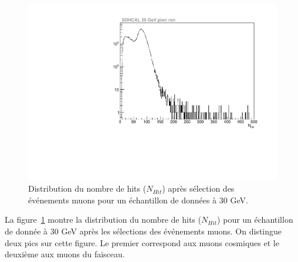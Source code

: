 \begin{figure}[!ht]
  \begin{center}
    \includegraphics[width=.7\textwidth]{SDHCAL/figs/nhitMuon.pdf}
    \caption{Distribution du nombre de hits ($N_{Hit}$) après sélection des événements muons pour un échantillon de données à 30 GeV.}
    \label{fig:nhitMuon}
  \end{center}
\end{figure}
La figure~\ref{fig:nhitMuon} montre la distribution du nombre de hits ($N_{Hit}$) pour un échantillon de donnée à 30 GeV après les sélections des événements muons. On distingue deux pics sur cette figure. Le premier correspond aux muons cosmiques et le deuxième aux muons du faisceau.

